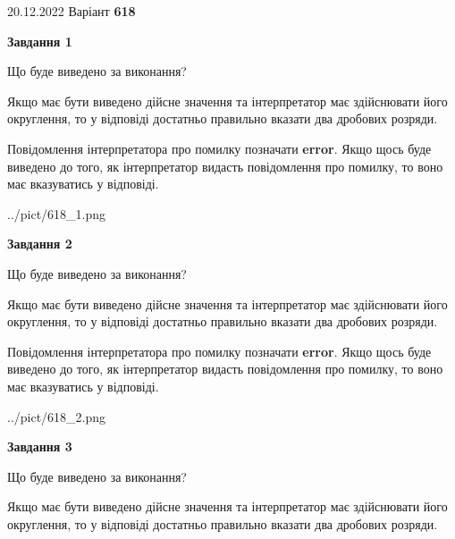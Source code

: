 \documentclass[12pt, ukrainian]{article}
\begin{document}
{20.12.2022 Варіант \No \textbf { 618 }\par}
{
\begin {Large}

{\begin {center}\textbf{Завдання 1}\end {center}}\par
Що буде виведено за виконання? \par

Якщо має бути виведено дійсне значення та інтерпретатор має здійснювати його округлення, 
то у відповіді достатньо правильно вказати два дробових розряди.

Повідомлення інтерпретатора про помилку позначати \textbf{error}.
Якщо щось буде виведено до того, як інтерпретатор видасть повідомлення про помилку, 
то воно має вказуватись у відповіді. \par

\begin{center}
	{../pict/618_1.png}
\end{center}
\newpage

{\begin {center}\textbf{Завдання 2}\end {center}}\par
Що буде виведено за виконання? \par

Якщо має бути виведено дійсне значення та інтерпретатор має здійснювати його округлення, 
то у відповіді достатньо правильно вказати два дробових розряди.

Повідомлення інтерпретатора про помилку позначати \textbf{error}.
Якщо щось буде виведено до того, як інтерпретатор видасть повідомлення про помилку, 
то воно має вказуватись у відповіді. \par

\begin{center}
	{../pict/618_2.png}
\end{center}
\newpage

{\begin {center}\textbf{Завдання 3}\end {center}}\par
Що буде виведено за виконання? \par

Якщо має бути виведено дійсне значення та інтерпретатор має здійснювати його округлення, 
то у відповіді достатньо правильно вказати два дробових розряди.


\end{Large}}
\end{document}
